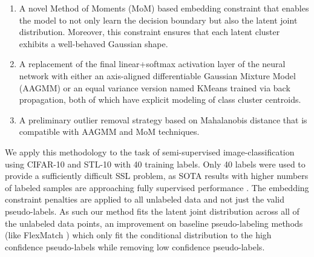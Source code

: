 \documentclass[10pt,twocolumn,letterpaper]{article}
\begin{document}
\begin{enumerate}
	\item A novel Method of Moments (MoM) based embedding constraint that enables the model to not only learn the decision boundary but also the latent joint distribution. 
	Moreover, this constraint ensures that each latent cluster exhibits a well-behaved Gaussian shape.
	\item A replacement of the final linear+softmax activation layer of the neural network with either an axis-aligned differentiable Gaussian Mixture Model (AAGMM) or an equal variance version named KMeans trained via back propagation, both of which have explicit modeling of class cluster centroids. 
	\item A preliminary outlier removal strategy based on Mahalanobis distance that is compatible with AAGMM and MoM techniques.
\end{enumerate}

We apply this methodology to the task of semi-supervised image-classification using CIFAR-10 \cite{cifar10} and STL-10 \cite{coates2011analysis} with 40 training labels. 
Only 40 labels were used to provide a sufficiently difficult SSL problem, as SOTA results with higher numbers of labeled samples are approaching fully supervised performance \cite{zheng2023simmatchv2}.
The embedding constraint penalties are applied to all unlabeled data and not just the valid pseudo-labels.  
As such our method fits the latent joint distribution across all of the unlabeled data points, an improvement on baseline pseudo-labeling methods (like FlexMatch \cite{zhang2021flexmatch}) which only fit the conditional distribution to the high confidence pseudo-labels while removing low confidence pseudo-labels.
\end{document}
